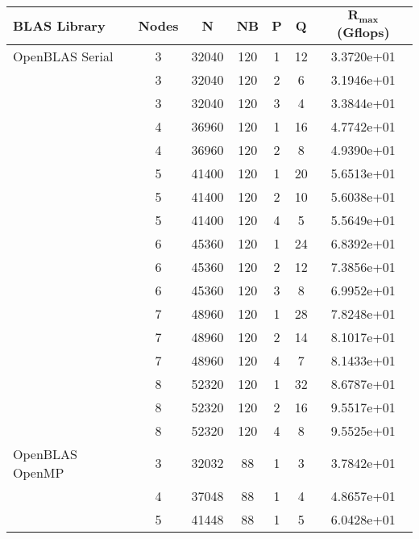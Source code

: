 \begin{table}[H]
\begin{center}
\begin{tabular}{ |l|c|c|c|c|c|c| } 
\hline
\textbf{BLAS Library} & \textbf{Nodes} & \textbf{N} & \textbf{NB} & \textbf{P} & \textbf{Q} & \textbf{$\mathbf{R_{max}}$} \textbf{(Gflops)} \\ 
\hline
OpenBLAS Serial & 3 & 32040 & 120 & 1 & 12 & 3.3720e+01 \\ 
                & 3 & 32040 & 120 & 2 &  6 & 3.1946e+01 \\
                & 3 & 32040 & 120 & 3 &  4 & 3.3844e+01 \\
                \cline{2-7} 
                & 4 & 36960 & 120 & 1 & 16 & 4.7742e+01 \\ 
                & 4 & 36960 & 120 & 2 &  8 & 4.9390e+01 \\ 
                \cline{2-7} 
                & 5 & 41400 & 120 & 1 & 20 & 5.6513e+01 \\ 
                & 5 & 41400 & 120 & 2 & 10 & 5.6038e+01 \\ 
                & 5 & 41400 & 120 & 4 &  5 & 5.5649e+01 \\ 
                \cline{2-7} 
                & 6 & 45360 & 120 & 1 & 24 & 6.8392e+01 \\ 
                & 6 & 45360 & 120 & 2 & 12 & 7.3856e+01 \\ 
                & 6 & 45360 & 120 & 3 &  8 & 6.9952e+01 \\ 
                \cline{2-7} 
                & 7 & 48960 & 120 & 1 & 28 & 7.8248e+01 \\ 
                & 7 & 48960 & 120 & 2 & 14 & 8.1017e+01 \\ 
                & 7 & 48960 & 120 & 4 &  7 & 8.1433e+01 \\ 
                \cline{2-7} 
                & 8 & 52320 & 120 & 1 & 32 & 8.6787e+01 \\ 
                & 8 & 52320 & 120 & 2 & 16 & 9.5517e+01 \\ 
                & 8 & 52320 & 120 & 4 &  8 & 9.5525e+01 \\ 
\hline
OpenBLAS OpenMP & 3 & 32032 & 88 & 1 & 3 & 3.7842e+01 \\ 
                \cline{2-7} 
                & 4 & 37048 & 88 & 1 & 4 & 4.8657e+01 \\ 
                \cline{2-7} 
                & 5 & 41448 & 88 & 1 & 5 & 6.0428e+01 \\ 
                \cline{2-7} 

\end{tabular}
\end{center}
\end{table}
